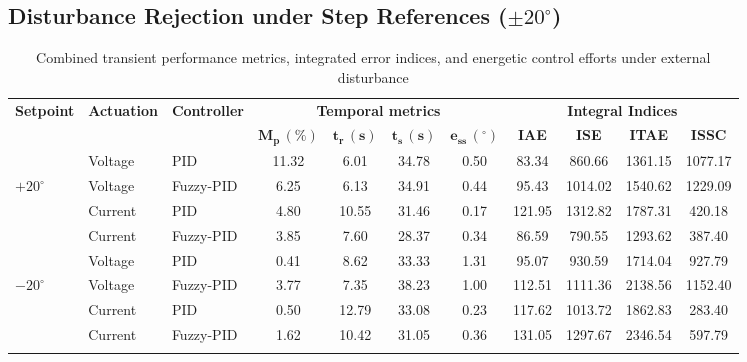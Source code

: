 \documentclass[pdflatex,sn-mathphys-num,iicol]{sn-jnl}
\theoremstyle{thmstyleone}%
\theoremstyle{thmstyletwo}%
\theoremstyle{thmstylethree}%
\begin{document}
\subsection{Disturbance Rejection under Step References ($\pm20^\circ$)}
\label{sub:disturbance_rejection}

\begin{table}[t]
\caption{Combined transient performance metrics, integrated error indices, and energetic control efforts under external disturbance}\label{tab:performance_metrics_disturbance}%
\begin{center}
\begin{minipage}{\textwidth}
\scriptsize %
\setlength{\tabcolsep}{4pt} %
\begin{tabular*}{\textwidth}{@{\extracolsep{\fill}}@{}lllcccccccc@{}}
\toprule
\textbf{Setpoint} & \textbf{Actuation} & \textbf{Controller} & \multicolumn{4}{c}{\textbf{Temporal metrics}} & \multicolumn{4}{c}{\textbf{Integral Indices}} \\
\cmidrule(lr){4-7} \cmidrule(lr){8-11}
& & & $\mathbf{M_p\,(\%)}$ & $\mathbf{t_r\,(\text{s})}$ & $\mathbf{t_s\,(\text{s})}$ & $\mathbf{e_{\text{ss}}\,(^{\circ})}$ & \textbf{IAE} & \textbf{ISE} & \textbf{ITAE} & \textbf{ISSC} \\
\midrule
            & Voltage  & PID       & 11.32 & 6.01  & 34.78 & 0.50 & 83.34  & 860.66  & 1361.15 & 1077.17 \\
$+20^{\circ}$ & Voltage  & Fuzzy-PID & 6.25  & 6.13  & 34.91 & 0.44 & 95.43  & 1014.02 & 1540.62 & 1229.09 \\
            & Current  & PID       & 4.80  & 10.55 & 31.46 & 0.17 & 121.95 & 1312.82 & 1787.31 & 420.18  \\
            & Current  & Fuzzy-PID & 3.85  & 7.60  & 28.37 & 0.34 & 86.59  & 790.55  & 1293.62 & 387.40  \\
\midrule
            & Voltage  & PID       & 0.41  & 8.62  & 33.33 & 1.31 & 95.07  & 930.59  & 1714.04 & 927.79  \\
$-20^{\circ}$ & Voltage  & Fuzzy-PID & 3.77  & 7.35  & 38.23 & 1.00 & 112.51 & 1111.36 & 2138.56 & 1152.40 \\
            & Current  & PID       & 0.50  & 12.79 & 33.08 & 0.23 & 117.62 & 1013.72 & 1862.83 & 283.40  \\
            & Current  & Fuzzy-PID & 1.62  & 10.42 & 31.05 & 0.36 & 131.05 & 1297.67 & 2346.54 & 597.79  \\
\botrule
\end{tabular*}
\end{minipage}
\end{center}
\end{table}
 
\end{document}
